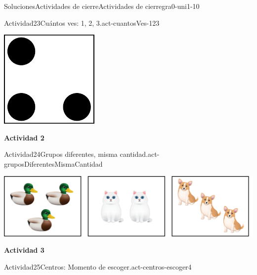 \documentclass[twoside,10pt,]{article}
\begin{document}
\begin{solutions-section}{Soluciones}{Actividades de cierre}{}{Actividades de cierre}{}{}{gra0-uni1-10}
\begin{activitysolution}{Actividad}{23}{Cuántos ves: 1, 2, 3.}{act-cuantosVes-123}
\begin{sidebyside}{3}{0.0416666666666667}{0.0416666666666667}{0.0833333333333333}
\begin{sbspanel}{0.25}
\includegraphics[width=\linewidth]{external/svg-source/tikz-file-136324.pdf}
\end{sbspanel}%
\end{sidebyside}%
\end{activitysolution}%
\par\medskip
\noindent\textbf{\large{}\space\textperiodcentered\space{}Actividad 2}
\begin{activitysolution}{Actividad}{24}{Grupos diferentes, misma cantidad.}{act-gruposDiferentesMismaCantidad}%
\begin{image}{0}{1}{0}{}%
\includegraphics[width=\linewidth]{external/png-source/K.1.C Beta Student Workbook.AnimalGroups.png}
\end{image}%
%
\end{activitysolution}%
\par\medskip
\noindent\textbf{\large{}\space\textperiodcentered\space{}Actividad 3}
\begin{activitysolution}{Actividad}{25}{Centros: Momento de escoger.}{act-centros-escoger4}%

\end{activitysolution}
\end{solutions-section}
\end{document}
